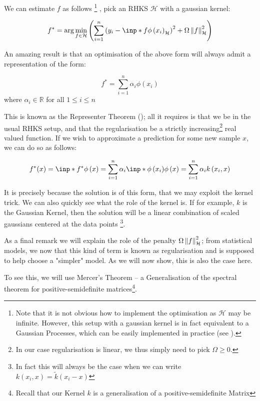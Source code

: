 We can estimate $f$ as follows
\footnote{Note that it is not obvious how to implement the optimisation as $\mathcal{H}$ may be infinite. However,
this setup with a gaussian kernel is in fact equivalent to a Gaussian Processes, which can be easily
implemented in practice (see \cite{JordanNotes}).}
, pick an RHKS $\mathcal{H}$ with a gaussian kernel:

\begin{equation}
    f^{*}=\arg \min _{f \in \mathcal{H}}\left(
        \sum_{i=1}^{n} 
        \left(y_{i} - \inp*{f}{\phi\left(x_{i}\right)}_{\mathcal{H}} \right)^{2}
        + \Omega \norm{f}_{\mathcal{H}}^{2}\right)
\end{equation}

An amazing result is that an optimisation of the above form will always admit a representation of the
form:

\[
    f^{*} = \sum_{i=1}^{n} \alpha_{i} \phi\left(x_{i}\right)
\]
where $\alpha_{i} \in \mathbb{R}$ for all $1 \leq i \leq n$

This is known as the Representer Theorem (\cite{scholkopf2001generalized}); all it requires is that we be in the usual RHKS setup, and that
the regularisation be a strictly increasing\footnote{In our case regularisation is linear,
we thus simply need to pick $\Omega \geq 0$.} real valued function.
If we wish to approximate a prediction for some new sample $x$, we can do so as follows:


$$
    f^{*}(x) = \inp*{f^{*}}{\phi\left(x\right)} = 
    \sum_{i=1}^{n} \alpha_{i} \inp*{\phi\left(x_i\right)}{\phi\left(x\right)} =
    \sum_{i=1}^{n} \alpha_{i} k\left(x_i, x\right)
$$

It is precisely because the solution is of this form, that we may exploit the kernel trick. We can
also quickly see what the role of the kernel is. If for example, $k$ is the Gaussian Kernel, then
the solution will be a linear combination of scaled gaussians centered at the data points
\footnote{In fact this will always be the case when we can write $k\left(x_i, x\right) = \tilde{k}\left(x_i - x\right)$}. 

As a final remark we will explain the role of the penalty $\Omega \left\lVert f\right\rVert_{\mathcal{H}}^{2}$; from 
statistical models, we now that this kind of term is known as regularisation and is supposed to help 
choose a "simpler" model. As we will now show, this is also the case here.

To see this, we will use Mercer's Theorem -- a Generalisation of the spectral theorem for positive-semidefinite
matrices\footnote{Recall that our Kernel $k$ is a generalisation of a positive-semidefinite Matrix}.


